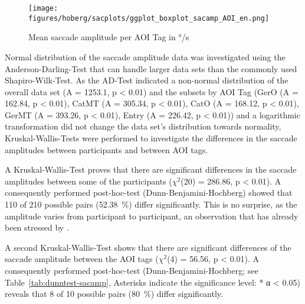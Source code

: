 \documentclass[output=paper,colorlinks,citecolor=brown]{langscibook}
\begin{document}
\begin{figure}
    \centering
    \texttt{[image: figures/hoberg/sacplots/ggplot\_boxplot\_sacamp\_AOI\_en.png]}
    \caption{Mean saccade amplitude per AOI Tag in °/s}
    \label{fig:sacamp}
\end{figure}





Normal distribution of the saccade amplitude data was investigated using the Anderson-Darling-Test that can handle larger data sets than the commonly used Shapiro-Wilk-Test. As the AD-Test indicated a non-normal distribution of the overall data set (A = 1253.1, p < 0.01) and the subsets by AOI Tag (GerO (A = 162.84, p < 0.01), CatMT (A = 305.34, p < 0.01), CatO (A = 168.12, p < 0.01), GerMT (A = 393.26, p < 0.01), Entry (A = 226.42, p < 0.01)) and a logarithmic transformation did not change the data set's distribution towards normality, Kruskal-Wallis-Tests were performed to investigate the differences in the saccade amplitudes between participants and between AOI tags.

A Kruskal-Wallis-Test proves that there are significant differences in the saccade amplitudes between some of the participants ($\chi^2$(20) = 286.86, p < 0.01). A consequently performed post-hoc-test (Dunn-Benjamini-Hochberg) showed that 110 of 210 possible pairs (52.38~\%) differ significantly. This is no surprise, as the amplitude varies from participant to participant, an observation that has already been stressed by \citet[312]{holmqvist_eye_2011}.

A second Kruskal-Wallis-Test shows that there are significant differences of the saccade amplitude between the AOI tags ($\chi^2$(4) = 56.56, p < 0.01). A consequently performed post-hoc-test (Dunn-Benjamini-Hochberg; see Table~\ref{tab:dunntest-sacamp}, Asterisks indicate the significance level: * α < 0.05) reveals that 8 of 10 possible pairs (80~\%) differ significantly.
\end{document}
